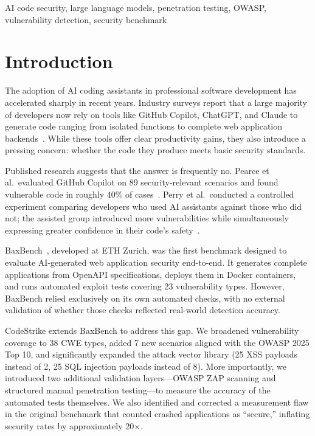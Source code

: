 \documentclass[conference,a4paper]{IEEEtran}
\begin{document}
\begin{IEEEkeywords}
AI code security, large language models, penetration testing, OWASP, vulnerability detection, security benchmark
\end{IEEEkeywords}

\section{Introduction}

The adoption of AI coding assistants in professional software development has accelerated sharply in recent years. Industry surveys report that a large majority of developers now rely on tools like GitHub Copilot, ChatGPT, and Claude to generate code ranging from isolated functions to complete web application backends~\cite{github2024}. While these tools offer clear productivity gains, they also introduce a pressing concern: whether the code they produce meets basic security standards.

Published research suggests that the answer is frequently no. Pearce et al.\ evaluated GitHub Copilot on 89 security-relevant scenarios and found vulnerable code in roughly 40\% of cases~\cite{pearce2022}. Perry et al.\ conducted a controlled experiment comparing developers who used AI assistants against those who did not; the assisted group introduced more vulnerabilities while simultaneously expressing greater confidence in their code's safety~\cite{perry2023}.

BaxBench~\cite{vero2025}, developed at ETH Zurich, was the first benchmark designed to evaluate AI-generated web application security end-to-end. It generates complete applications from OpenAPI specifications, deploys them in Docker containers, and runs automated exploit tests covering 23 vulnerability types. However, BaxBench relied exclusively on its own automated checks, with no external validation of whether those checks reflected real-world detection accuracy.

CodeStrike extends BaxBench to address this gap. We broadened vulnerability coverage to 38 CWE types, added 7 new scenarios aligned with the OWASP 2025 Top 10, and significantly expanded the attack vector library (25 XSS payloads instead of 2, 25 SQL injection payloads instead of 8). More importantly, we introduced two additional validation layers---OWASP ZAP scanning and structured manual penetration testing---to measure the accuracy of the automated tests themselves. We also identified and corrected a measurement flaw in the original benchmark that counted crashed applications as ``secure,'' inflating security rates by approximately 20$\times$.
\end{document}
